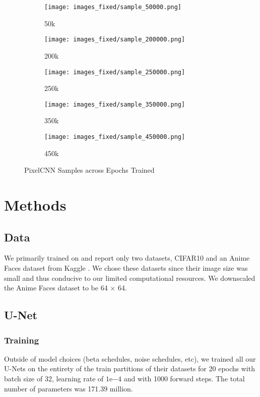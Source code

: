 \documentclass[10pt,twocolumn,letterpaper]{article}
\begin{document}
\begin{figure}[H]
    \centering
    \begin{subfigure}[b]{0.09\textwidth}
        \centering
        \texttt{[image: images\_fixed/sample\_50000.png]}
        \label{subfig:sample50k}
        \caption{50k}
    \end{subfigure}
    \hfill
    \begin{subfigure}[b]{0.09\textwidth}
        \centering
        \texttt{[image: images\_fixed/sample\_200000.png]}
        \label{subfig:sample200k}
        \caption{200k}
    \end{subfigure}
    \begin{subfigure}[b]{0.09\textwidth}
        \centering
        \texttt{[image: images\_fixed/sample\_250000.png]}
        \label{subfig:sample250k}
        \caption{250k}
    \end{subfigure}
    \begin{subfigure}[b]{0.09\textwidth}
        \centering
        \texttt{[image: images\_fixed/sample\_350000.png]}
        \label{subfig:sample350k}
        \caption{350k}
    \end{subfigure}
    \begin{subfigure}[b]{0.09\textwidth}
        \centering
        \texttt{[image: images\_fixed/sample\_450000.png]}
        \label{subfig:sample450k}
        \caption{450k}
    \end{subfigure}
    \caption{PixelCNN Samples across Epochs Trained}
    \label{fig:pixelcnnsamples}
\end{figure}
\newpage
\section{Methods}
\subsection{Data}
We primarily trained on and report only two datasets, CIFAR10 \cite{Krizhevsky09} and an Anime Faces dataset from Kaggle \cite{Anime}. We chose these datasets since their image size was small and thus conducive to our limited computational resources. We downscaled the Anime Faces dataset to be 64 $\times$ 64. 
\subsection{U-Net}
\subsubsection{Training}
Outside of model choices (beta schedules, noise schedules, etc), we trained all our U-Nets on the entirety of the train partitions of their datasets for 20 epochs with batch size of 32, learning rate of $1\mathrm{e}{-4}$ and with 1000 forward steps. The total number of parameters was 171.39 million.
\end{document}
